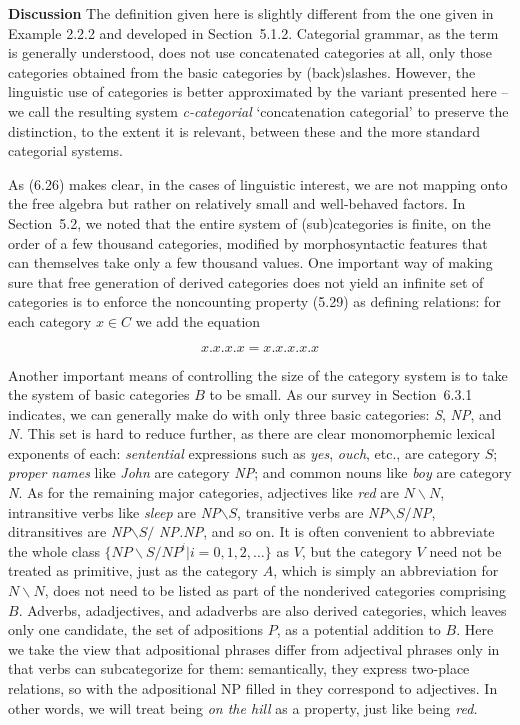 \smallskip\noindent
{\bf Discussion} The definition given here is slightly different from the one
given in Example 2.2.2 and developed in Section~5.1.2. Categorial grammar, as
the term is generally understood, does not use concatenated categories at all,
only those categories obtained from the basic categories by (back)slashes.
However, the linguistic use of categories is better approximated by the
variant presented here -- we call the resulting system {\it c-categorial}
`concatenation categorial' to preserve the distinction, to the extent it is
relevant, between these and the more standard categorial systems.

\medskip\noindent As (6.26) makes clear, in the cases of linguistic interest,
we are not mapping onto the free algebra but rather on relatively small and
well-behaved factors.  In Section~5.2, we noted that the entire system of
(sub)categories is finite, on the order of a few thousand categories, modified
by morphosyntactic features that can themselves take only a few thousand
values. One important way of making sure that free generation of derived
categories does not yield an infinite set of categories is to enforce the
noncounting property (5.29) as defining relations: for each category $x \in C$
we add the equation

\begin{equation}
x.x.x.x = x.x.x.x.x
\end{equation}

\smallskip\noindent Another important means of controlling the size of the
category system is to take the system of basic categories $B$ to be small. As
our survey in Section~6.3.1 indicates, we can generally make do with only
three basic categories: {\it S}, {\it NP}, and $N$. This set is hard to reduce
further, as there are clear monomorphemic lexical exponents of each: {\it
  sentential} expressions such as {\it yes}, {\it ouch}, etc., are category
$S$; {\it proper names} like {\it John} are category {\it NP}; and common
nouns like {\it boy} are category {\it N}.  As for the remaining major
categories, adjectives like {\it red} are $N\backslash N$, intransitive verbs
like {\it sleep} are {\it NP}$\backslash S$, transitive verbs are {\it
  NP}$\backslash S /${\it NP}, ditransitives are {\it NP}$\backslash S /$ {\it
  NP.NP}, and so on. It is often convenient to abbreviate the whole class
$\{\textit{NP} \backslash S / \textit{NP}^i|i=0,1,2,\ldots\}$ as $V$, but the
category $V$ need not be treated as primitive, just as the category $A$, which
is simply an abbreviation for $N\backslash N$, does not need to be listed as
part of the nonderived categories comprising $B$. Adverbs, adadjectives, and
adadverbs are also derived categories, which leaves only one candidate, the
set of adpositions $P$, as a potential addition to $B$.  Here we take the view
that adpositional phrases differ from adjectival phrases only in that verbs
can subcategorize for them: semantically, they express two-place relations, so
with the adpositional NP filled in they correspond to adjectives. In other
words, we will treat being {\it on the hill} as a property, just like being
{\it red.}

